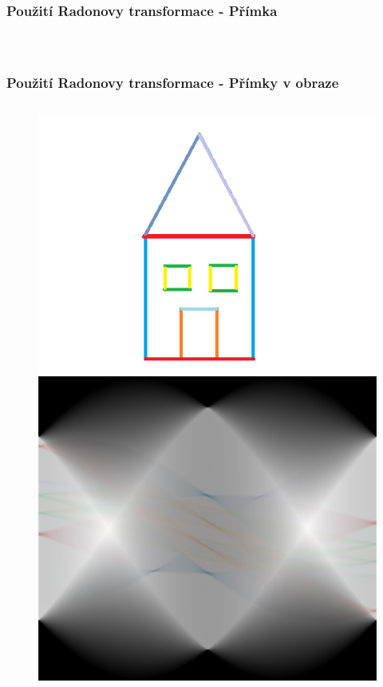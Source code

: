 \documentclass{beamer}
\begin{document}
\begin{frame}
\frametitle{Použití Radonovy transformace - Přímka}
\begin{figure}
\begin{columns}
	 \label{fig:sub3}
\end{columns}
\end{figure}
\end{frame}

\begin{frame}
\frametitle{Použití Radonovy transformace - Přímky v obraze}
\begin{figure}
\begin{columns}
	  \includegraphics[width=\linewidth]{house.png}
	  \includegraphics[width=\linewidth]{sinohouse.png}

\end{columns}
\end{figure}
\end{frame}
\end{document}
